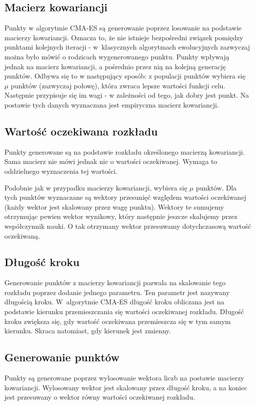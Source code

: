 \documentclass{mini}
\begin{document}
\subsection{Macierz kowariancji} \label{macierz}
Punkty w algorytmie CMA-ES są generowanie poprzez losowanie na podstawie macierzy kowariancji. Oznacza to, że nie istnieje bezpośredni związek pomiędzy punktami kolejnych iteracji - w~klasycznych algorytmach ewolucyjnych zazwyczaj można było mówić o rodzicach wygenerowanego punktu. Punkty wpływają jednak na macierz kowariancji, a pośrednio przez nią na kolejną generację punktów. Odbywa się to w następujący sposób: z populacji punktów wybiera się $\mu$ punktów (zazwyczaj połowę), która zwraca lepsze wartości funkcji celu. Następnie przypisuje się im wagi - w zależności od tego, jak dobry jest punkt. Na postawie tych danych wyznaczana jest empiryczna macierz kowariancji.

\subsection{Wartość oczekiwana rozkładu} \label{wartoscoczekiwana}
Punkty generowane są na podstawie rozkładu określonego macierzą kowariancji. Sama macierz nie mówi jednak nic o wartości oczekiwanej. Wymaga to oddzielnego wyznaczenia tej wartości.

Podobnie jak w przypadku macierzy kowariancji, wybiera się $\mu$ punktów. Dla tych punktów wyznaczane są wektory przesunięć względem wartości oczekiwanej (każdy wektor jest skalowany przez wagę punktu). Wektory te sumujemy otrzymując pewien wektor wynikowy, który następnie jeszcze skalujemy przez współczynnik nauki. O tak otrzymany wektor przesuwamy dotychczasową wartość oczekiwaną.

\subsection{Długość kroku}
Generowanie punktów z macierzy kowariancji pozwala na skalowanie tego rozkładu poprzez dodanie jednego parametru. Ten parametr jest nazywany długością kroku. W~algorytmie CMA-ES długość kroku obliczana jest na podstawie kierunku przemieszczania się wartości oczekiwanej rozkładu. Długość kroku zwiększa się, gdy wartość oczekiwana przemieszcza się w tym samym kierunku. Skraca natomiast, gdy kierunek jest zmienny.

\subsection{Generowanie punktów}
Punkty są generowane poprzez wylosowanie wektora liczb na postawie macierzy kowariancji. Wylosowany wektor jest skalowany przez długość kroku, a na koniec jest przesuwany o wektor równy wartości oczekiwanej rozkładu.
\end{document}
